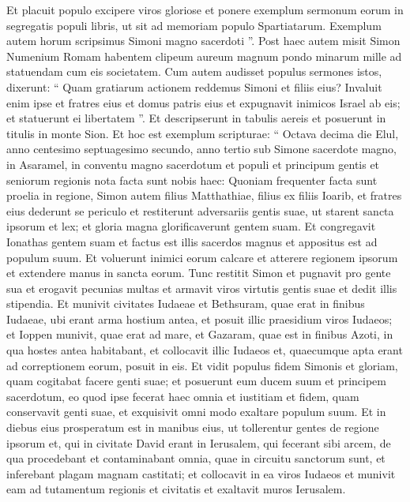 \begin{biblechapter}
\begin{biblechapter}
\begin{biblechapter}
\begin{biblechapter}
\begin{biblechapter}
\begin{biblechapter}
\begin{biblechapter}
\begin{biblechapter}
\begin{biblechapter}
\begin{biblechapter}
\begin{biblechapter}
\begin{biblechapter}
\begin{biblechapter}
\begin{biblechapter}
\verse Et placuit populo excipere viros gloriose et ponere exemplum sermonum eorum in segregatis populi libris, ut sit ad memoriam populo Spartiatarum. Exemplum autem horum scripsimus Simoni magno sacerdoti ”. 
\verse Post haec autem misit Simon Numenium Romam habentem clipeum aureum magnum pondo minarum mille ad statuendam cum eis societatem.
 \verse Cum autem audisset populus sermones istos, dixerunt: “ Quam gratiarum actionem reddemus Simoni et filiis eius? 
\verse Invaluit enim ipse et fratres eius et domus patris eius et expugnavit inimicos Israel ab eis; et statuerunt ei libertatem ”. Et descripserunt in tabulis aereis et posuerunt in titulis in monte Sion. 
\verse Et hoc est exemplum scripturae: “ Octava decima die Elul, anno centesimo septuagesimo secundo, anno tertio sub Simone sacerdote magno, in Asaramel, 
\verse in conventu magno sacerdotum et populi et principum gentis et seniorum regionis nota facta sunt nobis haec: 
\verse Quoniam frequenter facta sunt proelia in regione, Simon autem filius Matthathiae, filius ex filiis Ioarib, et fratres eius dederunt se periculo et restiterunt adversariis gentis suae, ut starent sancta ipsorum et lex; et gloria magna glorificaverunt gentem suam. 
\verse Et congregavit Ionathas gentem suam et factus est illis sacerdos magnus et appositus est ad populum suum. 
\verse Et voluerunt inimici eorum calcare et atterere regionem ipsorum et extendere manus in sancta eorum. 
\verse Tunc restitit Simon et pugnavit pro gente sua et erogavit pecunias multas et armavit viros virtutis gentis suae et dedit illis stipendia. 
\verse Et munivit civitates Iudaeae et Bethsuram, quae erat in finibus Iudaeae, ubi erant arma hostium antea, et posuit illic praesidium viros Iudaeos; 
\verse et Ioppen munivit, quae erat ad mare, et Gazaram, quae est in finibus Azoti, in qua hostes antea habitabant, et collocavit illic Iudaeos et, quaecumque apta erant ad correptionem eorum, posuit in eis. 
\verse Et vidit populus fidem Simonis et gloriam, quam cogitabat facere genti suae; et posuerunt eum ducem suum et principem sacerdotum, eo quod ipse fecerat haec omnia et iustitiam et fidem, quam conservavit genti suae, et exquisivit omni modo exaltare populum suum. 
 \verse Et in diebus eius prosperatum est in manibus eius, ut tollerentur gentes de regione ipsorum et, qui in civitate David erant in Ierusalem, qui fecerant sibi arcem, de qua procedebant et contaminabant omnia, quae in circuitu sanctorum sunt, et inferebant plagam magnam castitati; 
\verse et collocavit in ea viros Iudaeos et munivit eam ad tutamentum regionis et civitatis et exaltavit muros Ierusalem. 

\end{biblechapter}
\end{biblechapter}
\end{biblechapter}
\end{biblechapter}
\end{biblechapter}
\end{biblechapter}
\end{biblechapter}
\end{biblechapter}
\end{biblechapter}
\end{biblechapter}
\end{biblechapter}
\end{biblechapter}
\end{biblechapter}
\end{biblechapter}
